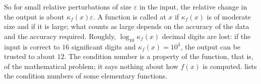 So for small relative perturbations of size $\varepsilon$ in the input, the relative change in the output is about $\kappa_f(x)\varepsilon$. A function is called  at $x$ if $\kappa_f(x)$ is of moderate size and  if it is large; what counts as large depends on the accuracy of the data and the accuracy required. Roughly, $\log_{10}\kappa_f(x)$ decimal digits are lost: if the input is correct to $16$ significant digits and $\kappa_f(x)=10^4$, the output can be trusted to about $12$. The condition number is a property of the function, that is, of the mathematical problem; it says nothing about how $f(x)$ is computed.  lists the condition numbers of some elementary functions.

\begin{table}
\end{table}

